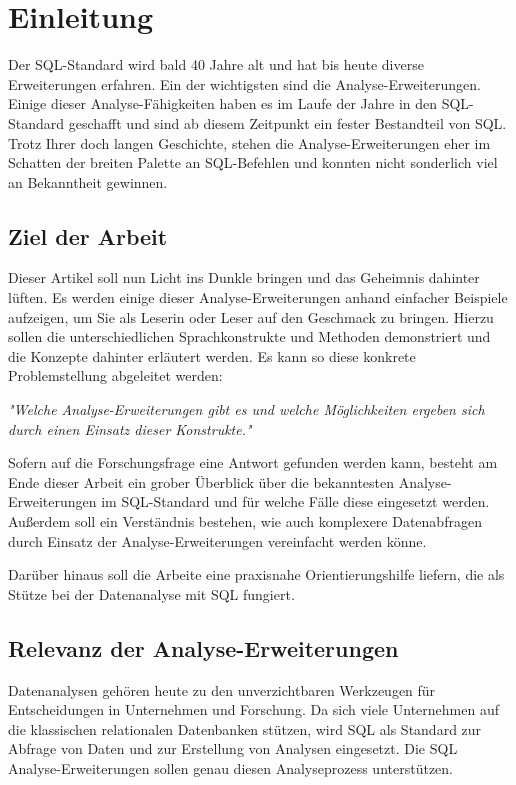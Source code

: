 \chapter{Einleitung}
Der SQL-Standard wird bald 40 Jahre alt und hat bis heute diverse Erweiterungen erfahren.
Ein der wichtigsten sind die Analyse-Erweiterungen. Einige dieser Analyse-Fähigkeiten
haben es im Laufe der Jahre in den SQL-Standard geschafft und sind ab diesem Zeitpunkt
ein fester Bestandteil von SQL. Trotz Ihrer doch langen Geschichte, stehen die Analyse-Erweiterungen
eher im Schatten der breiten Palette an SQL-Befehlen und konnten nicht sonderlich
viel an Bekanntheit gewinnen.

\section{Ziel der Arbeit}
Dieser Artikel soll nun Licht ins Dunkle bringen und das Geheimnis dahinter lüften.
Es werden einige dieser Analyse-Erweiterungen anhand einfacher Beispiele
aufzeigen, um Sie als Leserin oder Leser auf den Geschmack zu bringen. Hierzu
sollen die unterschiedlichen Sprachkonstrukte und Methoden demonstriert und die
Konzepte dahinter erläutert werden. Es kann so diese konkrete Problemstellung abgeleitet
werden:

\begin{center}
	\textit{"Welche Analyse-Erweiterungen gibt es und welche Möglichkeiten ergeben
	sich durch einen Einsatz dieser Konstrukte."}
\end{center}

Sofern auf die Forschungsfrage eine Antwort gefunden werden kann, besteht am
Ende dieser Arbeit ein grober Überblick über die bekanntesten Analyse-Erweiterungen
im SQL-Standard und für welche Fälle diese eingesetzt werden. Außerdem soll ein Verständnis
bestehen, wie auch komplexere Datenabfragen durch Einsatz der Analyse-Erweiterungen
vereinfacht werden könne.

Darüber hinaus soll die Arbeite eine praxisnahe Orientierungshilfe liefern, die als
Stütze bei der Datenanalyse mit SQL fungiert.

\section{Relevanz der Analyse-Erweiterungen}
Datenanalysen gehören heute zu den unverzichtbaren Werkzeugen für Entscheidungen
in Unternehmen und Forschung. Da sich viele Unternehmen auf die klassischen
relationalen Datenbanken stützen, wird SQL als Standard zur Abfrage von Daten und
zur Erstellung von Analysen eingesetzt. Die SQL Analyse-Erweiterungen sollen
genau diesen Analyseprozess unterstützen.


